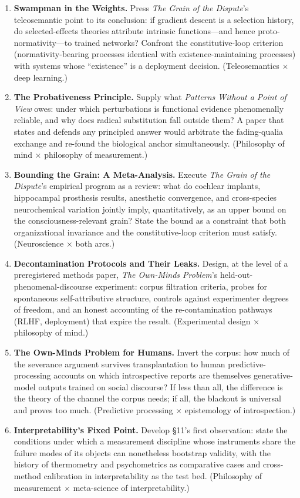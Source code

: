 \documentclass[11pt]{article}
\newcommand{\PP}{\emph{Patterns Without a Point of View}}
\newcommand{\GD}{\emph{The Grain of the Dispute}}
\newcommand{\OM}{\emph{The Own-Minds Problem}}
\begin{document}
\begin{enumerate}[itemsep=0.45em]
\item \textbf{Swampman in the Weights.} Press \GD{}'s teleosemantic point to its conclusion: if gradient descent is a selection history, do selected-effects theories attribute intrinsic functions---and hence proto-normativity---to trained networks? Confront the constitutive-loop criterion (normativity-bearing processes identical with existence-maintaining processes) with systems whose ``existence'' is a deployment decision. (Teleosemantics $\times$ deep learning.)

\item \textbf{The Probativeness Principle.} Supply what \PP{} owes: under which perturbations is functional evidence phenomenally reliable, and why does radical substitution fall outside them? A paper that states and defends any principled answer would arbitrate the fading-qualia exchange and re-found the biological anchor simultaneously. (Philosophy of mind $\times$ philosophy of measurement.)

\item \textbf{Bounding the Grain: A Meta-Analysis.} Execute \GD{}'s empirical program as a review: what do cochlear implants, hippocampal prosthesis results, anesthetic convergence, and cross-species neurochemical variation jointly imply, quantitatively, as an upper bound on the consciousness-relevant grain? State the bound as a constraint that both organizational invariance and the constitutive-loop criterion must satisfy. (Neuroscience $\times$ both arcs.)

\item \textbf{Decontamination Protocols and Their Leaks.} Design, at the level of a preregistered methods paper, \OM{}'s held-out-phenomenal-discourse experiment: corpus filtration criteria, probes for spontaneous self-attributive structure, controls against experimenter degrees of freedom, and an honest accounting of the re-contamination pathways (RLHF, deployment) that expire the result. (Experimental design $\times$ philosophy of mind.)

\item \textbf{The Own-Minds Problem for Humans.} Invert the corpus: how much of the severance argument survives transplantation to human predictive-processing accounts on which introspective reports are themselves generative-model outputs trained on social discourse? If less than all, the difference is the theory of the channel the corpus needs; if all, the blackout is universal and proves too much. (Predictive processing $\times$ epistemology of introspection.)

\item \textbf{Interpretability's Fixed Point.} Develop \S 11's first observation: state the conditions under which a measurement discipline whose instruments share the failure modes of its objects can nonetheless bootstrap validity, with the history of thermometry and psychometrics as comparative cases and cross-method calibration in interpretability as the test bed. (Philosophy of measurement $\times$ meta-science of interpretability.)
\end{enumerate}
\end{document}
